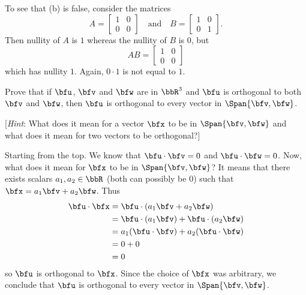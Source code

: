 \begin{questions}
\begin{solution}
    To see that (b) is false, consider the matrices
    \[
      A=\begin{bmatrix}%
        1&0\\0&0
      \end{bmatrix}\quad\text{and}\quad%
      B=\begin{bmatrix}%
        1&0\\0&1
      \end{bmatrix}.
    \]
    Then nullity of $A$ is $1$ whereas the nullity of $B$ is $0$, but
    \[
      AB=\begin{bmatrix}%
        1&0\\0&0
      \end{bmatrix}
    \]
    which has nullity $1$. Again, $0\cdot 1$ is not equal to $1$.

  \end{solution}
  \question[8] Prove that if $\bfu$, $\bfv$ and $\bfw$ are in $\bbR^3$ and
  $\bfu$ is orthogonal to both $\bfv$ and $\bfw$, then $\bfu$ is orthogonal
  to every vector in $\Span\{\bfv,\bfw\}$.

  [\emph{Hint}: What does it mean for a vector $\bfx$ to be in
  $\Span\{\bfv,\bfw\}$ and what does it mean for two vectors to be
  orthogonal?]
  \begin{solution}
    Starting from the top. We know that $\bfu\cdot\bfv=0$ and
    $\bfu\cdot\bfw=0$. Now, what does it mean for $\bfx$ to be in
    $\Span\{\bfv,\bfw\}$? It means that there exists scalars
    $a_1,a_2\in\bbR$ (both can possibly be $0$) such that
    $\bfx=a_1\bfv+a_2\bfw$. Thus
    \begin{align*}
      \bfu\cdot\bfx&=\bfu\cdot(a_1\bfv+a_2\bfw)\\
                   &=\bfu\cdot (a_1\bfv)+\bfu\cdot(a_2\bfw)\\
                   &=a_1(\bfu\cdot\bfv)+a_2(\bfu\cdot\bfw)\\
                   &=0+0\\
                   &=0
    \end{align*}
    so $\bfu$ is orthogonal to $\bfx$. Since the choice of $\bfx$ was
    arbitrary, we conclude that $\bfu$ is orthogonal to every vector in
    $\Span\{\bfv,\bfw\}$.
  \end{solution}
\end{questions}

